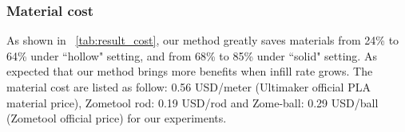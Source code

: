 
\subsubsection{Material cost}
As shown in \tabname~\ref{tab:result_cost}, our method greatly saves materials from 24\% to 64\% under ``hollow" setting, and from 68\% to 85\% under ``solid" setting.
As expected that our method brings more benefits when infill rate grows.
The material cost are listed as follow: 0.56 USD/meter (Ultimaker official PLA material price), Zometool rod: 0.19 USD/rod and Zome-ball: 0.29 USD/ball (Zometool official price) for our experiments. 


